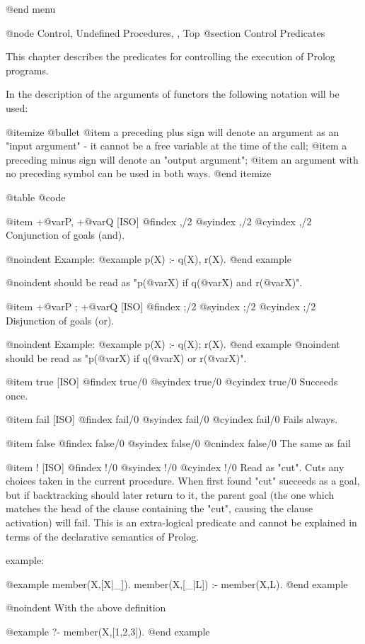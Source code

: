 {{{{@end menu

@node Control, Undefined Procedures, , Top
@section Control Predicates


This chapter describes the predicates for controlling the execution of
Prolog programs.

In the description of the arguments of functors the following notation
will be used:

@itemize @bullet
@item
a preceding plus sign will denote an argument as an "input argument" -
it cannot be a free variable at the time of the call; 
@item
 a preceding minus sign will denote an "output argument";
@item
an argument with no preceding symbol can be used in both ways.
@end itemize


@table @code

@item +@var{P}, +@var{Q} [ISO]
@findex ,/2
@syindex ,/2
@cyindex ,/2
Conjunction of goals (and).

@noindent
Example:
@example
 p(X) :- q(X), r(X).
@end example

@noindent
should be read as "p(@var{X}) if q(@var{X}) and r(@var{X})".

@item +@var{P} ; +@var{Q} [ISO]
@findex ;/2 
@syindex ;/2 
@cyindex ;/2 
Disjunction of goals (or).

@noindent
Example:
@example
 p(X) :- q(X); r(X).
@end example
@noindent
should be read as "p(@var{X}) if q(@var{X}) or r(@var{X})".

@item true [ISO]
@findex true/0
@syindex true/0
@cyindex true/0
Succeeds once.

@item fail [ISO]
@findex fail/0
@syindex fail/0
@cyindex fail/0
Fails always.

@item false
@findex false/0
@syindex false/0
@cnindex false/0
The same as fail

@item ! [ISO]
@findex !/0
@syindex !/0
@cyindex !/0
  Read as "cut". Cuts any choices taken in the current procedure.
When first found "cut" succeeds as a goal, but if backtracking should
later return to it, the parent goal (the one which matches the head of
the clause containing the "cut", causing the clause activation) will
fail. This is an extra-logical predicate and cannot be explained in
terms of the declarative semantics of Prolog.

example:

@example
 member(X,[X|_]).
 member(X,[_|L]) :- member(X,L).
@end example

@noindent
With the above definition

@example
 ?- member(X,[1,2,3]).
@end example

}}}}
